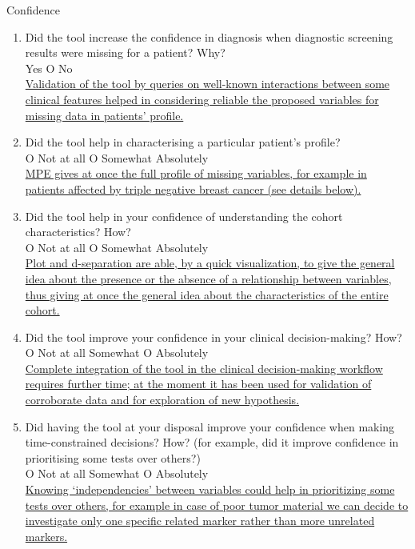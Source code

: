 \begin{framed}
	{\Large Confidence}
	\begin{enumerate} 
		\item Did the tool increase the confidence in diagnosis when diagnostic screening results were missing for a patient?  Why? \\
		 Yes O No \\
		\ul{Validation of the tool by queries on well-known interactions between some clinical features helped in considering reliable the proposed variables for missing data in patients' profile.}
		\item Did the tool help in characterising a particular patient's profile? \\
		O Not at all O Somewhat  Absolutely\\
		\ul{MPE gives at once the full profile of missing variables, for example in patients affected by triple negative breast cancer (see details below).}
		\item Did the tool help in your confidence of understanding the cohort characteristics?  How? \\
		O Not at all O Somewhat  Absolutely\\
		\ul{Plot and d-separation are able, by a quick visualization, to give the general idea about the presence or the absence of a relationship between variables, thus giving at once the general idea about the characteristics of the entire cohort.}
		\item Did the tool improve your confidence in your clinical decision-making?  How? \\ 
		O Not at all  Somewhat O Absolutely\\
		\ul{Complete integration of the tool in the clinical decision-making workflow requires further time; at the moment it has been used for validation of corroborate data and for exploration of new hypothesis.}
		\item Did having the tool at your disposal improve your confidence when making time-constrained decisions?  How? (for example, did it improve confidence in prioritising some tests over others?) \\
		O Not at all  Somewhat O Absolutely\\
		\ul{Knowing `independencies' between variables could help in prioritizing some tests over others, for example in case of poor tumor material we can decide to investigate only one specific related marker rather than more unrelated markers. }
	\end{enumerate}
	\label{ques:confidence}
\end{framed}

